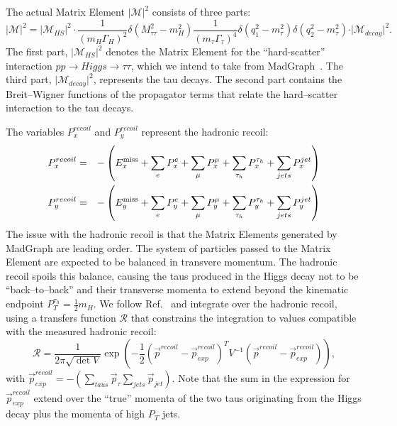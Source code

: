 The actual Matrix Element $\vert \mathcal{M} \vert^2$ consists of three parts:
\begin{equation*}
\vert \mathcal{M} \vert^2 = \vert \mathcal{M}_{HS} \vert^2 \cdot \frac{1}{(m_{H}\Gamma_{H})^{2}} \delta(M_{\tau\tau}^2 - m_{H}^2) 
\frac{1}{(m_{\tau}\Gamma_{\tau})^{4}} \delta(q_{1}^2 - m_{\tau}^2) \delta(q_{2}^2 - m_{\tau}^2) \cdot \vert \mathcal{M}_{decay} \vert^2.
\end{equation*}
The first part, $\vert \mathcal{M}_{HS} \vert^2$ denotes the Matrix Element for the ``hard-scatter'' interaction $pp \rightarrow Higgs \rightarrow \tau\tau$, 
which we intend to take from MadGraph~\cite{MadGraph}.
The third part, $\vert \mathcal{M}_{decay} \vert^2$, represents the tau decays.
The second part contains the Breit--Wigner functions of the propagator terms that relate the hard--scatter interaction to the tau decays.

The variables $P_{x}^{recoil}$ and $P_{y}^{recoil}$ represent the hadronic recoil:
\begin{eqnarray*}
P_{x}^{recoil} & = & -\left(E^{\mathrm{miss}}_{x} + \sum_{e} P_{x}^{e} + \sum_{\mu} P_{x}^{\mu} + \sum_{\tau_{h}} P_{x}^{\tau_{h}} + \sum_{jets} P_{x}^{jet} \right) \\
P_{y}^{recoil} & = & -\left(E^{\mathrm{miss}}_{y} + \sum_{e} P_{y}^{e} + \sum_{\mu} P_{y}^{\mu} + \sum_{\tau_{h}} P_{y}^{\tau_{h}} + \sum_{jets} P_{y}^{jet} \right) 
\end{eqnarray*}
The issue with the hadronic recoil is that the Matrix Elements generated by MadGraph are leading order.
The system of particles passed to the Matrix Element are expected to be balanced in transvere momentum.
The hadronic recoil spoils this balance, causing the taus produced in the Higgs decay not to be ``back--to--back'' 
and their transverse momenta to extend beyond the kinematic endpoint $P_{T}^{\tau_{h}} = \frac{1}{2} m_{H}$.
We follow Ref.~\cite{Alwall:2010cq} and integrate over the hadronic recoil, using a transfers function $\mathcal{R}$ that constrains the
integration to values compatible with the measured hadronic recoil:
\begin{equation*}
\mathcal{R} = \frac{1}{2\pi \sqrt{\det V}} \exp \left( -\frac{1}{2} \left( \vec{p}^{recoil} - \vec{p}_{exp}^{recoil} \right)^{T} V^{-1} \left( \vec{p}^{recoil} - \vec{p}_{exp}^{recoil} \right) \right),
\end{equation*}
with $\vec{p}_{exp}^{recoil} = -\left( \sum_{taus} \vec{p}_{\tau} \sum_{jets} \vec{p}_{jet} \right)$.
Note that the sum in the expression for $\vec{p}_{exp}^{recoil}$ extend over the ``true'' momenta of the two taus originating from the Higgs decay plus the momenta of high $P_{T}$ jets.

